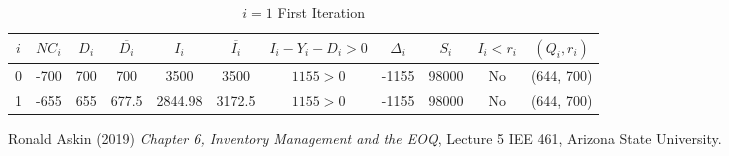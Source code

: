 \documentclass{article}
\begin{document}
\begin{table}
	\caption{$i = 1$ First Iteration}
	\centering
	\begin{tabular}{||c|c|c|c|c|c|c|c|c|c|c||}
		\toprule
		$i$     & $NC_{i}$     & $D_{i}$ &  $\overline{D_{i}}$ & $I_{i}$ &  $\overline{I_{i}}$ & $I_{i}  - Y_{i} - D_{i} > 0$ & $\Delta_{i}$ & $S_{i}$ & $I_{i} < r_{i}$ & $(Q_{i}, r_{i})$\\
		\midrule
		0	& -700	&  700  	& 700  		& 3500	& 3500		& $1155 > 0$		 & -1155		& 98000 	&	No 	& (644, 700) \\
		1	& -655	&  655 	& 677.5 		&2844.98	& 3172.5		& $1155 > 0$		 & -1155		& 98000 	&	No 	& (644, 700) \\
		\bottomrule
	\end{tabular}
	\label{tab:table}
\end{table}
\FloatBarrier





 \begin{thebibliography}{1}

 	Ronald Askin (2019) \emph{Chapter 6, Inventory Management and the EOQ}, Lecture 5 IEE 461, Arizona State University.

 \end{thebibliography}
\end{document}
